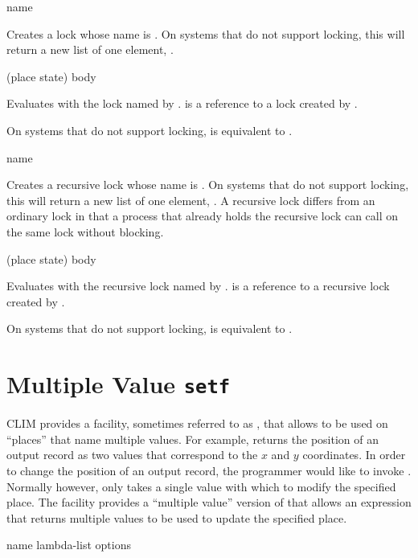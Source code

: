  {\optional name}

Creates a lock whose name is .  On systems that do not support
locking, this will return a new list of one element, .

 {(place \optional state) \body body}

Evaluates  with the lock named by .   is a
reference to a lock created by .

On systems that do not support locking,  is equivalent to
.

 {\optional name}

Creates a recursive lock whose name is .  On systems that do not
support locking, this will return a new list of one element, .  A
recursive lock differs from an ordinary lock in that a process that already
holds the recursive lock can call  on the same lock
without blocking.

 {(place \optional state) \body body}

Evaluates  with the recursive lock named by .  
is a reference to a recursive lock created by .  

On systems that do not support locking,  is
equivalent to .


\section {Multiple Value {\tt setf}}

CLIM provides a facility, sometimes referred to as , that allows
 to be used on ``places'' that name multiple values.  For example,
 returns the position of an output record as two
values that correspond to the $x$ and $y$ coordinates.  In order to change the
position of an output record, the programmer would like to invoke
.  Normally however,  only takes a
single value with which to modify the specified place.  The  facility
provides a ``multiple value'' version of  that allows an expression
that returns multiple values to be used to update the specified place.

 {name lambda-list \body options}


